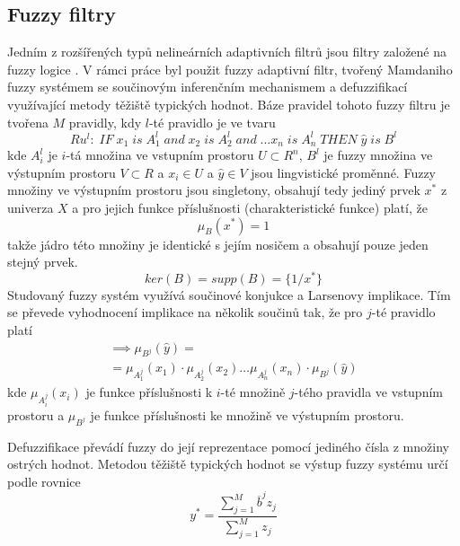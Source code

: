 \subsection{Fuzzy filtry}\label{chap:fuzzyf}
Jedním z rozšířených typů nelineárních adaptivních filtrů jsou filtry založené na fuzzy logice \cite{fuzzyf}. V rámci práce byl použit fuzzy adaptivní filtr, tvořený Mamdaniho fuzzy systémem se součinovým inferenčním mechanismem a defuzzifikací využívající metody těžiště typických hodnot. Báze pravidel tohoto fuzzy filtru je tvořena $M$ pravidly, kdy $l$-té pravidlo je ve tvaru
\begin{equation}
    Ru^l: \; IF\; x_1\; is\;A_1^l \;and \;x_2 \;is\; A_2^l\; and\; \dots x_n \; is \;A_n^l \; THEN \; \hat{y} \; is \; B^l  
\end{equation}
kde $A_i^l$ je $i$-tá množina ve vstupním prostoru $U \subset R^n$, $B^l$ je fuzzy množina ve výstupním prostoru $V \subset R$ a $x_i \in U$ a $\hat{y} \in V$ jsou lingvistické proměnné. Fuzzy množiny ve výstupním prostoru jsou singletony, obsahují tedy jediný prvek $x^*$ z univerza $X$ a pro jejich funkce příslušnosti (charakteristické funkce) platí, že
\begin{equation}
    \mu_{B}(x^*) = 1
\end{equation}
takže jádro této množiny je identické s jejím nosičem a obsahují pouze jeden stejný prvek.
\begin{equation}
    ker(B)=supp(B)=\{1/x^*\}
\end{equation}
Studovaný fuzzy systém využívá součinové konjukce a Larsenovy implikace. Tím se převede vyhodnocení implikace na několik součinů tak, že pro $j$-té pravidlo platí
\begin{multline}
    [\mu_{A_1^j}(x_1) \; AND \; \mu_{A_2^j}(x_2) \; AND \dots AND \; \mu_{A_n^j}(x_n)] \implies \mu_{B^j}(\hat{y}) =  \\ = \mu_{A_1^j}(x_1) \cdot \mu_{A_2^j}(x_2) \dots \mu_{A_n^j}(x_n) \cdot \mu_{B^j}(\hat{y})
\end{multline}
kde $\mu_{A_i^j}(x_i)$ je funkce příslušnosti k $i$-té množině $j$-tého pravidla ve vstupním prostoru a $\mu_{B^j}$ je funkce příslušnosti ke množině ve výstupním prostoru. 
\par
Defuzzifikace převádí fuzzy do její reprezentace pomocí jediného čísla z množiny ostrých hodnot. Metodou těžiště typických hodnot se výstup fuzzy systému určí podle rovnice
\begin{equation}
    y^*=\frac{\sum_{j=1}^M\overline{b}^j z_j}{\sum_{j=1}^M z_j}
\end{equation}
